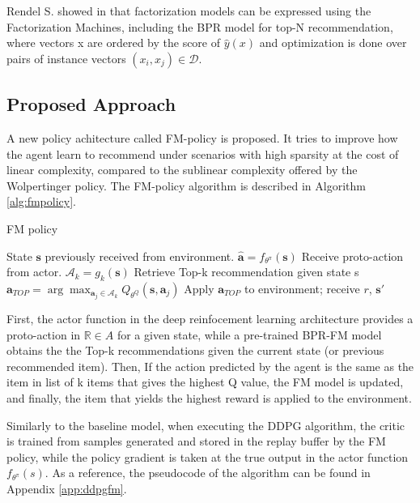 Rendel S. showed in \cite{rendle2012factorization} that factorization models can be expressed using the Factorization Machines, including the BPR model for top-N recommendation, where vectors x are ordered by the score of $\hat{y}(x)$ and optimization is done over pairs of instance vectors $(x_i, x_j) \in \mathcal{D}$.

\subsection{Proposed Approach}

A new policy achitecture called FM-policy is proposed. It tries to improve how the agent learn to recommend under scenarios with high sparsity at the cost of linear complexity, compared to the sublinear complexity offered by the Wolpertinger policy. The FM-policy algorithm is described in Algorithm \ref{alg:fmpolicy}.

\begin{center}
 \begin{algorithm}[!htbp]
    \SetAlgoLined\DontPrintSemicolon
    \caption{FM policy}
    \label{alg:fmpolicy}
    
    State $\mathbf{s}$ previously received from environment.\;
    $\hat{\mathbf{a}} = f_{\theta^{\pi}}(\mathbf{s})$ {Receive proto-action from actor}.\;
    $\mathcal{A}_k = g_k(\mathbf{s})$ {Retrieve Top-k recommendation given state s}\;
    $\mathbf{a}_{TOP} = \arg \max_{\mathbf{a}_j \in \mathcal{A}_k} Q_{\theta^{Q}}(\mathbf{s}, \mathbf{a}_j)$\;
    Apply $\mathbf{a}_{TOP}$ to environment; receive $r$, $\mathbf{s}'$\;
  \end{algorithm}
\end{center}

First, the actor function in the deep reinfocement learning architecture provides a proto-action in $\mathbb{R} \in {A}$ for a given state, while a pre-trained BPR-FM model obtains the the Top-k recommendations given the current state (or previous recommended item). Then, If the action predicted by the agent is the same as the item in list of k items that gives the highest Q value, the FM model is updated, and finally, the item that yields the highest reward is applied to the environment.

Similarly to the baseline model, when executing the DDPG algorithm, the critic is trained from samples generated and stored in the replay buffer by the FM policy, while the policy gradient is taken at the true output in the actor function $f_{\theta^{\pi}}(s)$. As a reference, the pseudocode of the algorithm can be found in Appendix \ref{app:ddpgfm}.
